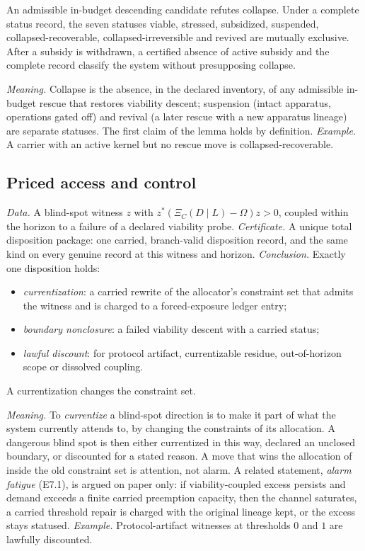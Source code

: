 \begin{lemma}\label{lem:e5}
An admissible in-budget descending candidate refutes collapse. Under a complete status record, the
seven statuses viable, stressed, subsidized, suspended, collapsed-recoverable,
collapsed-irreversible and revived are mutually exclusive. After a subsidy is withdrawn, a certified
absence of active subsidy and the complete record classify the system without presupposing collapse.
\end{lemma}

\emph{Meaning.} Collapse is the absence, in the declared inventory, of any admissible in-budget rescue
that restores viability descent;
suspension (intact apparatus, operations gated off) and revival (a later rescue with a new apparatus
lineage) are separate statuses. The first claim of the lemma holds by definition.
\emph{Example.} A carrier with an active kernel but no rescue move is collapsed-recoverable.

\subsection{Priced access and control}\label{sec:tmpl-access}

\begin{schema}[E7: alarm]\label{tmpl:e7}
\emph{Data.} A blind-spot witness $z$ with $z^*(\Xi_C(D \mid L) - \Omega)z > 0$, coupled within the
horizon to a failure of a declared viability probe.
\emph{Certificate.} A unique total disposition package: one carried, branch-valid disposition record,
and the same kind on every genuine record at this witness and horizon.
\emph{Conclusion.} Exactly one disposition holds:
\begin{itemize}
  \item \emph{currentization}: a carried rewrite of the allocator's constraint set that admits the
    witness and is charged to a forced-exposure ledger entry;
  \item \emph{boundary nonclosure}: a failed viability descent with a carried status;
  \item \emph{lawful discount}: for protocol artifact, currentizable residue, out-of-horizon scope or
    dissolved coupling.
\end{itemize}
A currentization changes the constraint set.
\end{schema}

\emph{Meaning.} To \emph{currentize} a blind-spot direction is to make it part of what the system
currently attends to, by changing the constraints of its allocation. A dangerous blind spot is then
either currentized in this way, declared an unclosed boundary, or discounted for a stated reason. A
move that wins the allocation of  inside the old constraint set is attention,
not alarm. A related statement, \emph{alarm fatigue} (E7.1), is argued on paper only: if
viability-coupled excess persists and demand exceeds a finite carried preemption capacity, then the
channel saturates, a carried threshold repair is charged with the original lineage kept, or the
excess stays statused.
\emph{Example.} Protocol-artifact witnesses at thresholds $0$ and $1$ are lawfully discounted.

